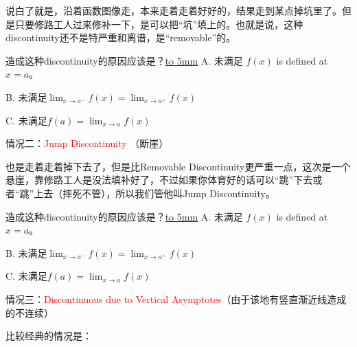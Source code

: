 \documentclass[UTF8]{ctexart}
\begin{document}
说白了就是，沿着函数图像走，本来走着走着好好的，结果走到某点掉坑里了。但是只要修路工人过来修补一下，是可以把“坑”填上的。也就是说，这种discontinuity还不是特严重和离谱，是“removable”的。

造成这种discontinuity的原因应该是？\underline{\hbox to 5mm{}}
A. 未满足 $f(x)$ is defined at $x = a$。

B. 未满足${\lim_{x \to a^-} f(x)} = {\lim_{x \to a^+} f(x)}$

C. 未满足$f(a) = {\lim_{x \to a} f(x)}$ 

情况二：\textcolor{red}{Jump Discontinuity} （断崖）
\begin{center}
\end{center}

也是走着走着掉下去了，但是比Removable Discontinuity更严重一点，这次是一个悬崖，靠修路工人是没法填补好了，不过如果你体育好的话可以“跳”下去或者“跳”上去（摔死不管），所以我们管他叫Jump Discontinuity。

造成这种discontinuity的原因应该是？\underline{\hbox to 5mm{}}
A. 未满足 $f(x)$ is defined at $x = a$。

B. 未满足${\lim_{x \to a^-} f(x)} = {\lim_{x \to a^+} f(x)}$

C. 未满足$f(a) = {\lim_{x \to a} f(x)}$ 

情况三：\textcolor{red}{Discontinuous due to Vertical Asymptotes}（由于该地有竖直渐近线造成的不连续）

比较经典的情况是：
\begin{center}
\end{center}
\end{document}

